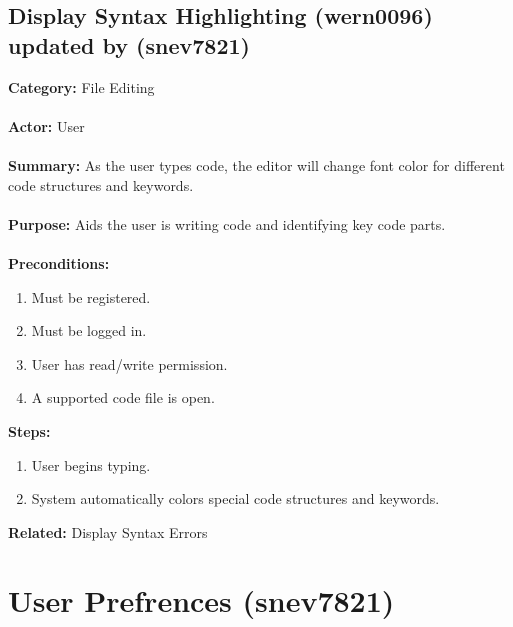 \documentclass[11pt]{report}
\begin{document}
\subsection{Display Syntax Highlighting (wern0096) updated by (snev7821)}
\begin{framed}

	\textbf{Category:} File Editing \\ \\
	\textbf{Actor:} User \\ \\
	\textbf{Summary:} As the user types code, the editor will change font color for different code structures and keywords. \\ \\
	\textbf{Purpose:} Aids the user is writing code and identifying key code parts. \\ \\
	\textbf{Preconditions:} 
	\begin{enumerate}
		\item Must be registered.
		\item Must be logged in.
		\item User has read/write permission.
		\item A supported code file is open.
	\end{enumerate}
	\textbf{Steps:}
	\begin{enumerate}
		\item User begins typing.
		\item System automatically colors special code structures and keywords.
	\end{enumerate}
	\textbf{Related:} Display Syntax Errors
\end{framed}

\newpage

\section{User Prefrences (snev7821)}
\end{document}
